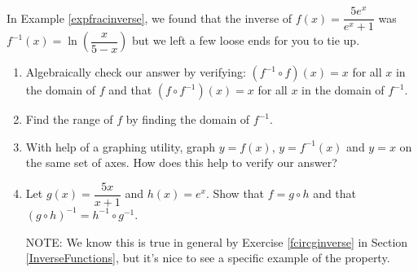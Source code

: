 \documentclass{ximera}
\begin{document}
\begin{problem}\label{checkingexpfracinverse} 
In Example \ref{expfracinverse}, we found that the inverse of $f(x) = \dfrac{5e^{x}}{e^{x}+1}$ was $f^{-1}(x) = \ln\left(\dfrac{x}{5-x}\right)$ but we left a few loose ends for you to tie up.  

\begin{enumerate}

\item Algebraically check our answer by verifying: $\left(f^{-1} \circ f\right)(x) = x$ for all $x$ in the domain of $f$ and that $\left(f \circ f^{-1}\right)(x) = x$ for all $x$ in the domain of $f^{-1}$.

\item Find the range of $f$ by finding the domain of $f^{-1}$.

\item With help of a graphing utility, graph $y = f(x)$,  $y = f^{-1}(x)$ and $y = x$ on the same set of axes.  How does this help to verify our answer?

\item Let $g(x) = \dfrac{5x}{x+1}$ and $h(x) = e^{x}$.  Show that $f = g \circ h$ and that $(g \circ h)^{-1} = h^{-1} \circ g^{-1}$. 

NOTE:  We know this is true in general by Exercise \ref{fcircginverse} in Section \ref{InverseFunctions}, but it's nice to see a specific example of the property.

\end{enumerate}
\end{problem}
\end{document}
